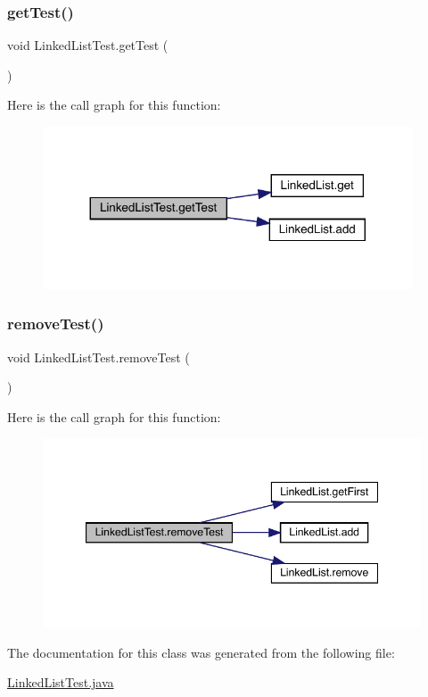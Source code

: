 \subsubsection{\texorpdfstring{get\+Test()}{getTest()}}
{\footnotesize\ttfamily void Linked\+List\+Test.\+get\+Test (\begin{DoxyParamCaption}{ }\end{DoxyParamCaption})\hspace{0.3cm}{\ttfamily [inline]}}

Here is the call graph for this function\+:
\nopagebreak
\begin{figure}[H]
\begin{center}
\leavevmode
\includegraphics[width=311pt]{class_linked_list_test_a8f9041662d2c4a40641ae02627ea3bcd_cgraph}
\end{center}
\end{figure}
\mbox{\label{class_linked_list_test_ad80814e7e3e8452c19b236fb070ee405}} 
\subsubsection{\texorpdfstring{remove\+Test()}{removeTest()}}
{\footnotesize\ttfamily void Linked\+List\+Test.\+remove\+Test (\begin{DoxyParamCaption}{ }\end{DoxyParamCaption})\hspace{0.3cm}{\ttfamily [inline]}}

Here is the call graph for this function\+:
\nopagebreak
\begin{figure}[H]
\begin{center}
\leavevmode
\includegraphics[width=347pt]{class_linked_list_test_ad80814e7e3e8452c19b236fb070ee405_cgraph}
\end{center}
\end{figure}


The documentation for this class was generated from the following file\+:\begin{DoxyCompactItemize}
\item 
\mbox{\hyperlink{_linked_list_test_8java}{Linked\+List\+Test.\+java}}\end{DoxyCompactItemize}
